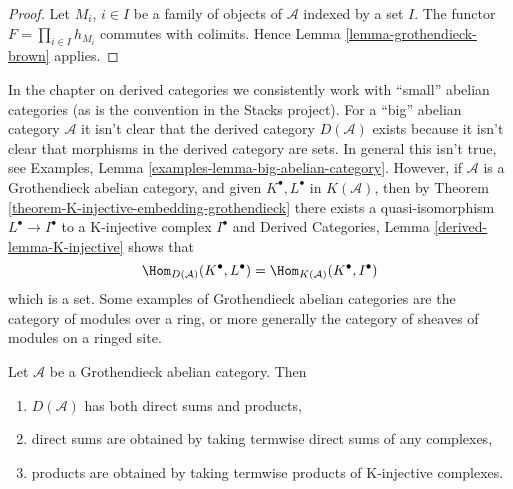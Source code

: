 \begin{proof}
Let $M_i$, $i \in I$ be a family of objects of $\mathcal{A}$ indexed
by a set $I$. The functor $F = \prod_{i \in I} h_{M_i}$
commutes with colimits. Hence
Lemma \ref{lemma-grothendieck-brown}
applies.
\end{proof}

\begin{remark}
\label{remark-existence-D}
In the chapter on derived categories we consistently work with
``small'' abelian categories (as is the convention in the Stacks
project). For a ``big'' abelian category $\mathcal{A}$ it isn't clear
that the derived category $D(\mathcal{A})$ exists because it isn't
clear that morphisms in the derived category are sets. In general this
isn't true, see
Examples, Lemma \ref{examples-lemma-big-abelian-category}.
However, if $\mathcal{A}$ is a Grothendieck abelian category, and given
$K^\bullet, L^\bullet$ in $K(\mathcal{A})$, then by
Theorem \ref{theorem-K-injective-embedding-grothendieck}
there exists a quasi-isomorphism $L^\bullet \to I^\bullet$ to a
K-injective complex $I^\bullet$ and
Derived Categories, Lemma \ref{derived-lemma-K-injective} shows that
$$
\Hom_{D(\mathcal{A})}(K^\bullet, L^\bullet) =
\Hom_{K(\mathcal{A})}(K^\bullet, I^\bullet)
$$
which is a set. Some examples of Grothendieck abelian categories
are the category of modules over a ring, or more generally
the category of sheaves of modules on a ringed site.
\end{remark}

\begin{lemma}
\label{lemma-derived-products}
Let $\mathcal{A}$ be a Grothendieck abelian category.
Then
\begin{enumerate}
\item $D(\mathcal{A})$ has both direct sums and products,
\item direct sums are obtained by taking termwise direct sums of
any complexes,
\item products are obtained by taking termwise products of
K-injective complexes.
\end{enumerate}
\end{lemma}

